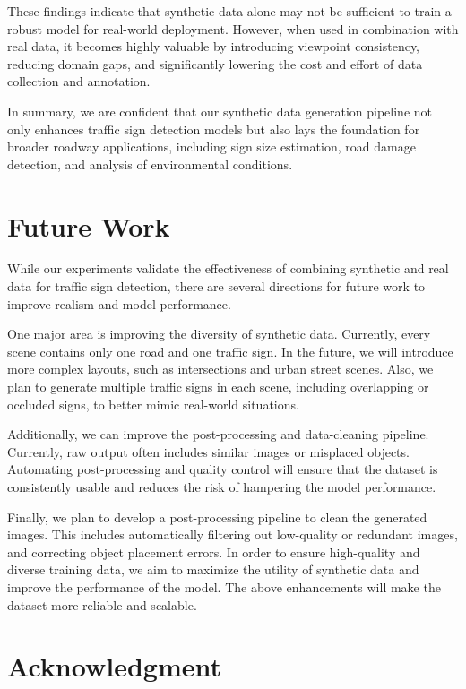 \documentclass[journal]{IEEEtran}
\begin{document}
These findings indicate that synthetic data alone may not be sufficient to train a robust model for real-world deployment. However, when used in combination with real data, it becomes highly valuable by introducing viewpoint consistency, reducing domain gaps, and significantly lowering the cost and effort of data collection and annotation.

In summary, we are confident that our synthetic data generation pipeline not only enhances traffic sign detection models but also lays the foundation for broader roadway applications, including sign size estimation, road damage detection, and analysis of environmental conditions.

\section{Future Work}
While our experiments validate the effectiveness of combining synthetic and real data for traffic sign detection, there are several directions for future work to improve realism and model performance.

One major area is improving the diversity of synthetic data. Currently, every scene contains only one road and one traffic sign. In the future, we will introduce more complex layouts, such as intersections and urban street scenes. Also, we plan to generate multiple traffic signs in each scene, including overlapping or occluded signs, to better mimic real-world situations.

Additionally, we can improve the post-processing and data-cleaning pipeline. Currently, raw output often includes similar images or misplaced objects. Automating post-processing and quality control will ensure that the dataset is consistently usable and reduces the risk of hampering the model performance.

Finally, we plan to develop a post-processing pipeline to clean the generated images. This includes automatically filtering out low-quality or redundant images, and correcting object placement errors. In order to ensure high-quality and diverse training data, we aim to maximize the utility of synthetic data and improve the performance of the model. The above enhancements will make the dataset more reliable and scalable.


\section*{Acknowledgment}
\end{document}
